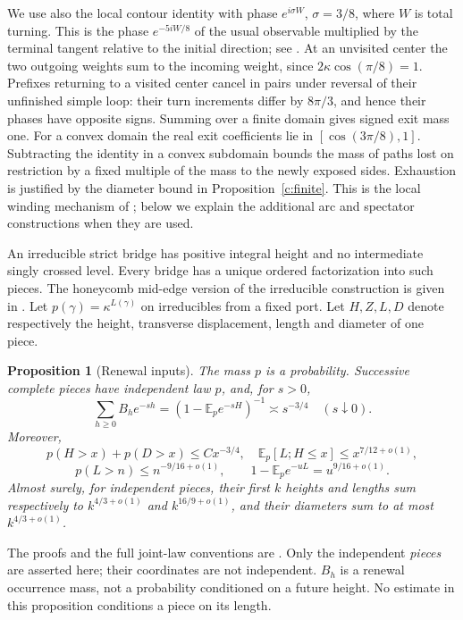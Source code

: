 \documentclass[11pt]{article}
\numberwithin{equation}{section}
\newtheorem{proposition}[theorem]{Proposition}
\theoremstyle{definition}\newtheorem{definition}[theorem]{Definition}
\theoremstyle{remark}\newtheorem{remark}[theorem]{Remark}
\begin{document}
We use also the local contour identity with phase
$e^{i\sigma W}$, $\sigma=3/8$, where $W$ is total turning.
This is the phase $e^{-5iW/8}$ of the usual observable multiplied by
the terminal tangent relative to the initial direction;
see \cite[Section 2, Lemma 1]{DuminilCopinSmirnov2012}.
At an unvisited center the two outgoing weights sum to the incoming
weight, since $2\kappa\cos(\pi/8)=1$. Prefixes returning to a visited
center cancel in pairs under reversal of their unfinished simple loop:
their turn increments differ by $8\pi/3$, and hence their phases have
opposite signs. Summing over a finite domain gives signed exit mass one.
For a convex domain the real exit coefficients lie in
$[\cos(3\pi/8),1]$. Subtracting the identity in a convex subdomain
bounds the mass of paths lost on restriction by a fixed multiple of the
mass to the newly exposed sides. Exhaustion is justified by the diameter
bound in Proposition~\ref{c:finite}. This is the local winding mechanism
of \cite{DuminilCopinSmirnov2012}; below we explain the additional arc
and spectator constructions when they are used.

An irreducible strict bridge has positive integral height and no
intermediate singly crossed level. Every bridge has a unique ordered
factorization into such pieces. The honeycomb mid-edge version of the
irreducible construction is given in \cite[Appendix]{BeatonEtAl2014}.
Let $p(\gamma)=\kappa^{L(\gamma)}$
on irreducibles from a fixed port. Let $H,Z,L,D$ denote respectively the
height, transverse displacement, length and diameter of one piece.

\begin{proposition}[Renewal inputs]\label{c:renewal}
The mass $p$ is a probability. Successive complete pieces have independent
law $p$, and, for $s>0$,
\[
 \sum_{h\ge0}B_he^{-sh}=
 (1-\mathbb E_p e^{-sH})^{-1}\asymp s^{-3/4}\quad(s\downarrow0).
\]
Moreover,
\[
 p(H>x)+p(D>x)\le Cx^{-3/4},\quad
 \mathbb E_p[L;H\le x]\le x^{7/12+o(1)},
\]
\[
 p(L>n)\le n^{-9/16+o(1)},\qquad
 1-\mathbb E_p e^{-uL}=u^{9/16+o(1)}.
\]
Almost surely, for independent pieces, their first $k$ heights and lengths
sum respectively to $k^{4/3+o(1)}$ and $k^{16/9+o(1)}$, and their
diameters sum to at most $k^{4/3+o(1)}$.
\end{proposition}
The proofs and the full joint-law conventions are
\cite[Propositions 2.2, 2.4, Remark 2.5 and Lemma 2.6]{Renewal}. Only the independent \emph{pieces}
are asserted here; their coordinates are not independent. $B_h$ is a
renewal occurrence mass, not a probability conditioned on a future height.
No estimate in this proposition conditions a piece on its length.
\end{document}

